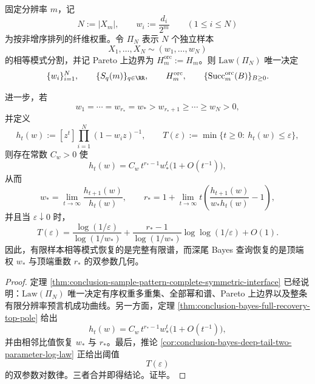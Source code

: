 \begin{theorem}\label{thm:conclusion-sample-pattern-deeptail-top-geometry-completeness}
固定分辨率 \(m\)，记
\[
N:=|X_m|,
\qquad
w_i:=\frac{d_i}{2^m}
\qquad (1\le i\le N)
\]
为按非增序排列的纤维权重。令 \(\Pi_N\) 表示 \(N\) 个独立样本
\[
X_1,\dots,X_N\sim (w_1,\dots,w_N)
\]
的相等模式分割，并记 Pareto 上边界为 \(H_m^{\mathrm{orc}}:=H_m\)。则 \(\mathrm{Law}(\Pi_N)\) 唯一决定
\[
\{w_i\}_{i=1}^{N},
\qquad
\{S_q(m)\}_{q\in\RR},
\qquad
H_m^{\mathrm{orc}},
\qquad
\{\mathrm{Succ}^{\mathrm{orc}}_m(B)\}_{B\ge 0}.
\]

进一步，若
\[
w_1=\cdots=w_{r_\ast}=w_\ast>w_{r_\ast+1}\ge\cdots\ge w_N>0,
\]
并定义
\[
h_t(w):=[z^t]\prod_{i=1}^{N}(1-w_i z)^{-1},
\qquad
T(\varepsilon):=\min\{t\ge 0:\ h_t(w)\le \varepsilon\},
\]
则存在常数 \(C_w>0\) 使
\[
h_t(w)=C_w\,t^{r_\ast-1}w_\ast^t\bigl(1+O(t^{-1})\bigr),
\]
从而
\[
w_\ast=\lim_{t\to\infty}\frac{h_{t+1}(w)}{h_t(w)},
\qquad
r_\ast
=
1+\lim_{t\to\infty}
t\left(\frac{h_{t+1}(w)}{w_\ast h_t(w)}-1\right),
\]
并且当 \(\varepsilon\downarrow 0\) 时，
\[
T(\varepsilon)
=
\frac{\log(1/\varepsilon)}{\log(1/w_\ast)}
+
\frac{r_\ast-1}{\log(1/w_\ast)}\log\log(1/\varepsilon)
+
O(1).
\]
因此，有限样本相等模式恢复的是完整有限谱，而深尾 Bayes 查询恢复的是顶端权 \(w_\ast\) 与顶端重数 \(r_\ast\) 的双参数几何。
\end{theorem}
\begin{proof}
定理 \ref{thm:conclusion-sample-pattern-complete-symmetric-interface} 已经说明：\(\mathrm{Law}(\Pi_N)\) 唯一决定有序权重多重集、全部幂和谱、Pareto 上边界以及整条有限分辨率预言机成功曲线。另一方面，定理 \ref{thm:conclusion-bayes-full-recovery-top-pole} 给出
\[
h_t(w)=C_w\,t^{r_\ast-1}w_\ast^t\bigl(1+O(t^{-1})\bigr),
\]
并由相邻比值恢复 \(w_\ast\) 与 \(r_\ast\)。最后，推论 \ref{cor:conclusion-bayes-deep-tail-two-parameter-log-law} 正给出阈值
\[
T(\varepsilon)
\]
的双参数对数律。三者合并即得结论。证毕。
\end{proof}

